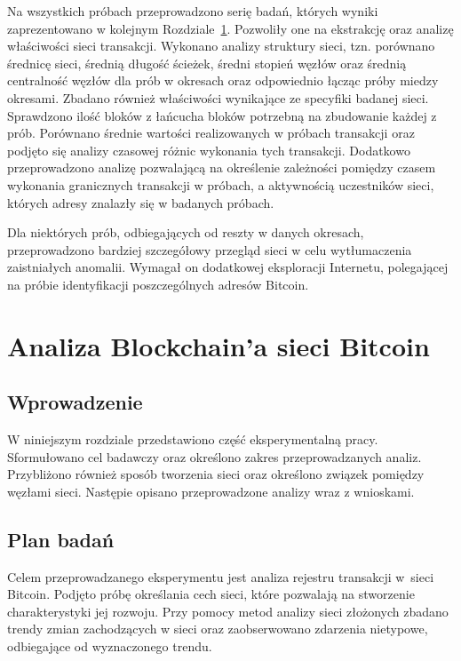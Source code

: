 \documentclass[12pt, oneside, final, openany]{mgr}
\begin{document}
\indent Na wszystkich próbach przeprowadzono serię badań, których wyniki zaprezentowano w kolejnym Rozdziale~\ref{analizaBlockchain}. Pozwoliły one na ekstrakcję oraz analizę właściwości sieci transakcji. Wykonano analizy struktury sieci, tzn. porównano średnicę sieci, średnią długość ścieżek, średni stopień węzłów oraz średnią centralność węzłów dla prób w okresach oraz odpowiednio łącząc próby miedzy okresami. Zbadano również właściwości wynikające ze specyfiki badanej sieci. Sprawdzono ilość bloków z łańcucha bloków potrzebną na zbudowanie każdej z prób. Porównano średnie wartości realizowanych w próbach transakcji  oraz podjęto się analizy czasowej różnic wykonania tych transakcji. Dodatkowo przeprowadzono analizę pozwalającą na określenie zależności pomiędzy czasem wykonania granicznych transakcji w próbach, a aktywnością uczestników sieci, których adresy znalazły się w badanych próbach.

\indent Dla niektórych prób, odbiegających od reszty w danych okresach, przeprowadzono bardziej szczegółowy przegląd sieci w celu wytłumaczenia zaistniałych anomalii. Wymagał on dodatkowej eksploracji Internetu, polegającej na próbie identyfikacji poszczególnych adresów Bitcoin.


\chapter{Analiza Blockchain'a sieci Bitcoin}
\label{analizaBlockchain}
\section{Wprowadzenie}

\indent W niniejszym rozdziale przedstawiono część eksperymentalną pracy. Sformułowano cel badawczy oraz określono zakres przeprowadzanych analiz. Przybliżono również sposób tworzenia sieci oraz określono związek pomiędzy węzłami sieci. Następie opisano przeprowadzone analizy wraz z wnioskami.

\section{Plan badań}

\indent Celem przeprowadzanego eksperymentu jest analiza rejestru transakcji w~sieci Bitcoin. Podjęto próbę określania cech sieci, które pozwalają na stworzenie charakterystyki jej rozwoju. Przy pomocy metod analizy sieci złożonych zbadano trendy zmian zachodzących w sieci oraz zaobserwowano zdarzenia nietypowe, odbiegające od wyznaczonego trendu. 
\end{document}
